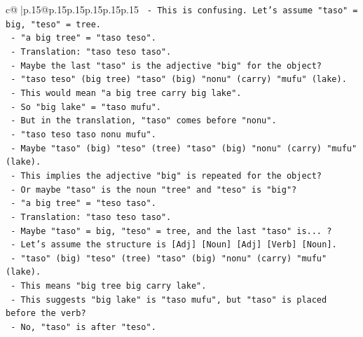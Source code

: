 \documentclass{article}
\begin{document}
{\begin{supertabular}{c@{$\;$}|p{.15\linewidth}@{}p{.15\linewidth}p{.15\linewidth}p{.15\linewidth}p{.15\linewidth}p{.15\linewidth}}
{{{\texttt{                        {-} This is confusing. Let's assume "taso" = big, "teso" = tree.} \\
\texttt{                        {-} "a big tree" = "taso teso".} \\
\texttt{                        {-} Translation: "taso teso taso".} \\
\texttt{                        {-} Maybe the last "taso" is the adjective "big" for the object?} \\
\texttt{                        {-} "taso teso" (big tree) "taso" (big) "nonu" (carry) "mufu" (lake).} \\
\texttt{                        {-} This would mean "a big tree carry big lake".} \\
\texttt{                        {-} So "big lake" = "taso mufu".} \\
\texttt{                        {-} But in the translation, "taso" comes before "nonu".} \\
\texttt{                        {-} "taso teso taso nonu mufu".} \\
\texttt{                        {-} Maybe "taso" (big) "teso" (tree) "taso" (big) "nonu" (carry) "mufu" (lake).} \\
\texttt{                        {-} This implies the adjective "big" is repeated for the object?} \\
\texttt{                        {-} Or maybe "taso" is the noun "tree" and "teso" is "big"?} \\
\texttt{                          {-} "a big tree" = "teso taso".} \\
\texttt{                          {-} Translation: "taso teso taso".} \\
\texttt{                          {-} Maybe "taso" = big, "teso" = tree, and the last "taso" is... ?} \\
\texttt{                          {-} Let's assume the structure is {[}Adj{]} {[}Noun{]} {[}Adj{]} {[}Verb{]} {[}Noun{]}.} \\
\texttt{                          {-} "taso" (big) "teso" (tree) "taso" (big) "nonu" (carry) "mufu" (lake).} \\
\texttt{                          {-} This means "big tree big carry lake".} \\
\texttt{                          {-} This suggests "big lake" is "taso mufu", but "taso" is placed before the verb?} \\
\texttt{                          {-} No, "taso" is after "teso".} \\
}}}
\end{supertabular}}
\end{document}
